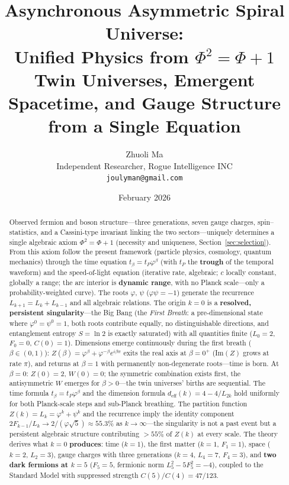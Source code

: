\documentclass[12pt,a4paper]{article}
\title{%
Asynchronous Asymmetric Spiral Universe:\\[4pt]
Unified Physics from $\Phi^2 = \Phi + 1$\\[8pt]
{\large Twin Universes, Emergent Spacetime, and Gauge Structure from a Single Equation}%
}
\author{Zhuoli Ma\\[4pt]
{\normalsize Independent Researcher, Rogue Intelligence INC}\\[2pt]
{\normalsize\texttt{joulyman@gmail.com}}}
\date{February 2026}
\begin{document}
\sloppy
\setlength{\emergencystretch}{2.5em}
\maketitle

\begin{abstract}
Observed fermion and boson structure---three generations, seven gauge charges, spin--statistics, and a Cassini-type invariant linking the two sectors---uniquely determines a single algebraic axiom $\Phi^2 = \Phi + 1$ (necessity and uniqueness, Section~\ref{sec:selection}). From this axiom follow the present framework (particle physics, cosmology, quantum mechanics) through the time equation $t_\beta = t_P\varphi^\beta$ (with $t_P$ the \textbf{trough} of the temporal waveform) and the speed-of-light equation (iterative rate, algebraic; $c$ locally constant, globally a range; the arc interior is \textbf{dynamic range}, with no Planck scale---only a probability-weighted curve). The roots $\varphi$, $\psi$ ($\varphi\psi = -1$) generate the recurrence $L_{k+1} = L_k + L_{k-1}$ and all algebraic relations. The origin $k = 0$ is a \textbf{resolved, persistent singularity}---the Big Bang (the \emph{First Breath}: a pre-dimensional state where $\varphi^0 = \psi^0 = 1$, both roots contribute equally, no distinguishable directions, and entanglement entropy $S = \ln 2$ is exactly saturated) with all quantities finite ($L_0 = 2$, $F_0 = 0$, $C(0) = 1$). Dimensions emerge continuously during the first breath ($\beta \in (0,1)$): $Z(\beta) = \varphi^\beta + \varphi^{-\beta}e^{i\beta\pi}$ exits the real axis at $\beta = 0^+$ (Im$(Z)$ grows at rate $\pi$), and returns at $\beta = 1$ with permanently non-degenerate roots---time is born. At $\beta = 0$: $Z(0) = 2$, $W(0) = 0$; the symmetric combination exists first, the antisymmetric $W$ emerges for $\beta > 0$---the twin universes' births are sequential. The time formula $t_\beta = t_P \varphi^\beta$ and the dimension formula $d_{\mathrm{eff}}(k) = 4 - 4/L_{2k}$ hold uniformly for both Planck-scale steps and sub-Planck breathing. The partition function $Z(k) = L_k = \varphi^k + \psi^k$ and the recurrence imply the identity component $2F_{k-1}/L_k \to 2/(\varphi\sqrt{5}) \approx 55.3\%$ as $k \to \infty$---the singularity is not a past event but a persistent algebraic structure contributing $>55\%$ of $Z(k)$ at every scale. The theory derives what $k = 0$ \textbf{produces}: time ($k = 1$), the first matter ($k = 1$, $F_1 = 1$), space ($k = 2$, $L_2 = 3$), gauge charges with three generations ($k = 4$, $L_4 = 7$, $F_4 = 3$), and \textbf{two dark fermions at $k = 5$} ($F_5 = 5$, fermionic norm $L_5^2 - 5F_5^2 = -4$), coupled to the Standard Model with suppressed strength $C(5)/C(4) = 47/123$.


\end{abstract}
\end{document}
